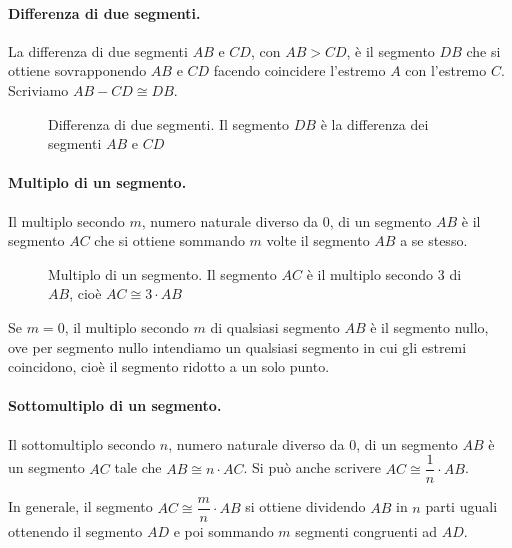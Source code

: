 \paragraph{Differenza di due segmenti.} La differenza di due segmenti 
\(AB\) e \(CD\), con \(AB>CD\), è il segmento \(DB\) che si ottiene 
sovrapponendo \(AB\) e \(CD\) facendo coincidere l'estremo \(A\) con 
l'estremo \(C\). Scriviamo \(AB-CD \cong DB\).


\begin{inaccessibleblock}
 \begin{figure}[htb]
\centering
\caption{Differenza di due segmenti. Il segmento \(DB\) è la differenza 
dei segmenti \(AB\) e \(CD\)}
\end{figure}
\end{inaccessibleblock}

\paragraph{Multiplo di un segmento.} Il multiplo secondo \(m\), numero 
naturale diverso da 0, di un segmento \(AB\) è il segmento \(AC\) che si 
ottiene sommando \(m\) volte il segmento \(AB\) a se stesso.


\begin{inaccessibleblock}
 \begin{figure}[htb]
\centering
\caption{Multiplo di un segmento. Il segmento \(AC\) è il multiplo 
secondo 3 di \(AB\), cioè \(AC\cong 3\cdot AB\)}
\end{figure}
\end{inaccessibleblock}

Se \(m=0\), il multiplo secondo \(m\) di qualsiasi segmento \(AB\) è il 
segmento nullo, ove per segmento nullo intendiamo un qualsiasi 
segmento in cui gli estremi coincidono, cioè il segmento ridotto a un 
solo punto.

\paragraph{Sottomultiplo di un segmento.} Il sottomultiplo secondo 
\(n\), numero naturale diverso da 0, di un segmento \(AB\) è un segmento 
\(AC\) tale che \(AB\cong n\cdot AC\). Si può anche scrivere \(AC \cong 
\dfrac{1}{n}\cdot AB\).

In generale, il segmento \(AC\cong\dfrac{m}{n}\cdot AB\) si ottiene 
dividendo \(AB\) in \(n\) parti uguali ottenendo il segmento \(AD\) e poi 
sommando \(m\) segmenti congruenti ad \(AD\).


